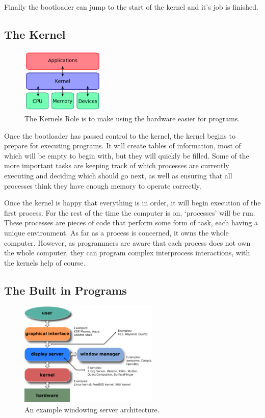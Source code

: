 \documentclass[a4paper]{report}
\begin{document}
Finally the bootloader can jump to the start of the kernel and it's job is finished.


\subsection*{The Kernel}

\begin{figure}
\centering
\includegraphics[width=150px]{images/kernel}
\caption{The Kernels Role is to make using the hardware easier for programs.}
\vspace{-10pt}
\label{fig:thekernel}
\end{figure}

Once the bootloader has passed control to the kernel, the kernel begins to prepare for executing programs. It will create tables of information, most of which will be empty to begin with, but they will quickly be filled. Some of the more important tasks are keeping track of which processes are currently executing and deciding which should go next, as well as ensuring that all processes think they have enough memory to operate correctly.

Once the kernel is happy that everything is in order, it will begin execution of the first process. For the rest of the time the computer is on, `processes' will be run. These processes are pieces of code that perform some form of task, each having a unique environment. As far as a process is concerned, it owns the whole computer. However, as programmers are aware that each process does not own the whole computer, they can program complex interprocess interactions, with the kernels help of course.


\subsection*{The Built in Programs}

\begin{figure}
\centering
\includegraphics[width=250px]{images/windowing}
\caption{An example windowing server architecture.}
\label{fig:theserver}
\end{figure}
\end{document}
